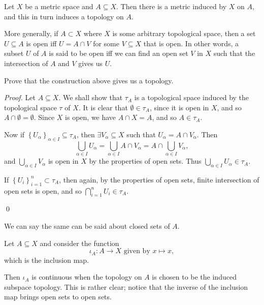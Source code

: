 \documentclass[notoc,notitlepage]{tufte-book}
\begin{document}
Let $X$ be a metric space and $A \subseteq X$. Then there is a metric induced by
$X$ on $A$, and this in turn induces a topology on $A$.

More generally, if $A \subset X$ where $X$ is some arbitrary topological space,
then a set $U \subseteq A$ is open iff $U = A \cap V$ for some $V \subseteq X$
that is open. In other words, a subset $U$ of $A$ is said to be open iff we can
find an open set $V$ in $X$ such that the intersection of $A$ and $V$ gives us
$U$.

\begin{ex}
  Prove that the construction above gives us a topology.
\end{ex}

\begin{proof}
  Let $A \subseteq X$. We shall show that $\tau_A$ is a topological space induced
  by the topological space $\tau$ of $X$. It is clear that $\emptyset \in \tau_A$,
  since it is open in $X$, and so $A \cap \emptyset = \emptyset$. Since $X$ is open,
  we have $A \cap X = A$, and so $A \in \tau_A$.

  Now if $\left\{ U_\alpha \right\}_{\alpha \in I} \subseteq \tau_A$, then
  $\exists V_\alpha \subseteq X$ such that $U_\alpha = A \cap V_\alpha$. Then
  \begin{equation*}
    \bigcup_{\alpha \in I} U_\alpha = \bigcup_{\alpha \in I} A \cap V_\alpha
      = A \cap \bigcup_{\alpha \in I} V_\alpha,
  \end{equation*}
  and $\bigcup_{\alpha \in I} V_\alpha$ is open in $X$ by the properties of open
  sets. Thus $\bigcup_{\alpha \in I} U_\alpha \in \tau_A$.

  If $\left\{ U_i \right\}_{i = 1}^{n} \subset \tau_A$, then again, by the properties
  of open sets, finite intersection of open sets is open, and so $\bigcap_{i=1}^{n} U_i \in \tau_A$.

  \qed\
\end{proof}

\begin{note}
  We can say the same can be said about closed sets of $A$.
\end{note}

\begin{eg}
  Let $A \subseteq X$ and consider the function
  \begin{equation*}
    \iota_A : A \to X \text{ given by } x \mapsto x,
  \end{equation*}
  which is the inclusion map.

  Then $\iota_A$ is continuous when the topology on $A$ is chosen to be the
  induced subspace topology. This is rather clear; notice that the inverse
  of the inclusion map brings open sets to open sets.
\end{eg}
\end{document}

